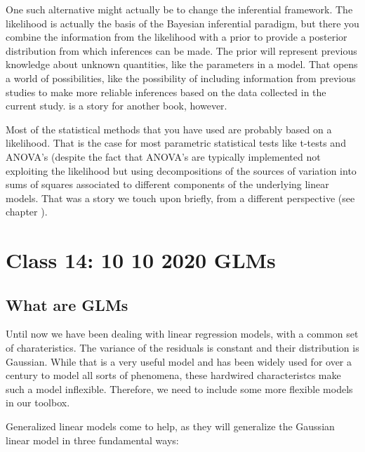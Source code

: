 \documentclass[
]{book}
\begin{document}
One such alternative might actually be to change the inferential framework. The likelihood is actually the basis of the Bayesian inferential paradigm, but there you combine the information from the likelihood with a prior to provide a posterior distribution from which inferences can be made. The prior will represent previous knowledge about unknown quantities, like the parameters in a model. That opens a world of possibilities, like the possibility of including information from previous studies to make more reliable inferences based on the data collected in the current study. is a story for another book, however.

Most of the statistical methods that you have used are probably based on a likelihood. That is the case for most parametric statistical tests like t-tests and ANOVA's (despite the fact that ANOVA's are typically implemented not exploiting the likelihood but using decompositions of the sources of variation into sums of squares associated to different components of the underlying linear models. That was a story we touch upon briefly, from a different perspective (see chapter ).

\hypertarget{aula14}{%
\chapter{Class 14: 10 10 2020 GLMs}\label{aula14}}

\hypertarget{what-are-glms}{%
\section{What are GLMs}\label{what-are-glms}}

Until now we have been dealing with linear regression models, with a common set of charateristics. The variance of the residuals is constant and their distribution is Gaussian. While that is a very useful model and has been widely used for over a century to model all sorts of phenomena, these hardwired characteristcs make such a model inflexible. Therefore, we need to include some more flexible models in our toolbox.

Generalized linear models come to help, as they will generalize the Gaussian linear model in three fundamental ways:
\end{document}
